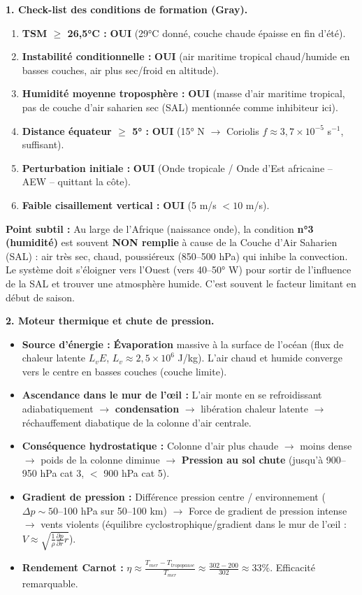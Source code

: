 \documentclass[11pt]{article}
\newcommand{\cle}[1]{{\popxbold\color{popdark}#1}}
\begin{document}
\begin{exoresolu}
\textbf{1. Check-list des conditions de formation (Gray).}
\begin{enumerate}
    \item \textbf{TSM $\ge$ 26,5°C :} \textbf{OUI} (29°C donné, couche chaude épaisse en fin d'été).
    \item \textbf{Instabilité conditionnelle :} \textbf{OUI} (air maritime tropical chaud/humide en basses couches, air plus sec/froid en altitude).
    \item \textbf{Humidité moyenne troposphère :} \textbf{OUI} (masse d'air maritime tropical, pas de couche d'air saharien sec (SAL) mentionnée comme inhibiteur ici).
    \item \textbf{Distance équateur $\ge$ 5° :} \textbf{OUI} (15° N $\to$ Coriolis $f \approx 3,7 \times 10^{-5}$ s$^{-1}$, suffisant).
    \item \textbf{Perturbation initiale :} \textbf{OUI} (Onde tropicale / \cle{Onde d'Est africaine} -- AEW -- quittant la côte).
    \item \textbf{Faible cisaillement vertical :} \textbf{OUI} (5 m/s $< 10$ m/s).
\end{enumerate}
\textbf{Point subtil :} Au large de l'Afrique (naissance onde), la condition \textbf{n°3 (humidité)} est souvent \textbf{NON remplie} à cause de la \cle{Couche d'Air Saharien (SAL)} : air très sec, chaud, poussiéreux (850--500 hPa) qui inhibe la convection. Le système doit s'éloigner vers l'Ouest (vers 40--50° W) pour sortir de l'influence de la SAL et trouver une atmosphère humide. C'est souvent le facteur limitant en début de saison.

\textbf{2. Moteur thermique et chute de pression.}
\begin{itemize}
    \item \textbf{Source d'énergie :} \textbf{Évaporation} massive à la surface de l'océan (flux de chaleur latente $L_v E$, $L_v \approx 2,5 \times 10^6$ J/kg). L'air chaud et humide converge vers le centre en basses couches (couche limite).
    \item \textbf{Ascendance dans le mur de l'œil :} L'air monte en se refroidissant adiabatiquement $\to$ \textbf{condensation} $\to$ libération chaleur latente $\to$ réchauffement diabatique de la colonne d'air centrale.
    \item \textbf{Conséquence hydrostatique :} Colonne d'air plus chaude $\to$ moins dense $\to$ poids de la colonne diminue $\to$ \textbf{Pression au sol chute} (jusqu'à 900--950 hPa cat 3, $<$ 900 hPa cat 5).
    \item \textbf{Gradient de pression :} Différence pression centre / environnement ($\Delta p \sim 50$--100 hPa sur 50--100 km) $\to$ Force de gradient de pression intense $\to$ vents violents (équilibre cyclostrophique/gradient dans le mur de l'œil : $V \approx \sqrt{\frac{1}{\rho}\frac{\partial p}{\partial r} r}$).
    \item \textbf{Rendement Carnot :} $\eta \approx \frac{T_{mer} - T_{tropopause}}{T_{mer}} \approx \frac{302 - 200}{302} \approx 33\%$. Efficacité remarquable.
\end{itemize}


\end{exoresolu}
\end{document}
